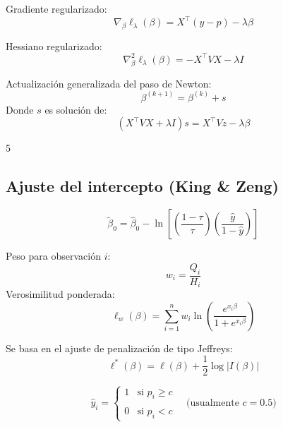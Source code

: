 \documentclass[12pt]{article}
\begin{document}
Gradiente regularizado:
\[
\nabla_\beta \ell_\lambda(\beta) = X^\top (y - p) - \lambda \beta
\]

Hessiano regularizado:
\[
\nabla^2_\beta \ell_\lambda(\beta) = - X^\top V X - \lambda I
\]

Actualización generalizada del paso de Newton:
\[
\beta^{(k+1)} = \beta^{(k)} + s
\]
Donde $s$ es solución de:
\[
(X^\top V X + \lambda I) s = X^\top V z - \lambda \beta
\]

5\subsection*{Ajuste del intercepto (King \& Zeng)}
\[
\tilde{\beta}_0 = \hat{\beta}_0 - \ln \left[ \left( \frac{1 - \tau}{\tau} \right) \left( \frac{\hat{y}}{1 - \hat{y}} \right) \right]
\]

Peso para observación $i$:
\[
w_i = \frac{Q_i}{H_i}
\]
Verosimilitud ponderada:
\[
\ell_w(\beta) = \sum_{i=1}^n w_i \ln \left( \frac{e^{x_i \beta}}{1 + e^{x_i \beta}} \right)
\]

Se basa en el ajuste de penalización de tipo Jeffreys:
\[
\ell^*(\beta) = \ell(\beta) + \frac{1}{2} \log |I(\beta)|
\]

\[
\hat{y}_i =
\begin{cases}
1 & \text{si } p_i \geq c \\\\
0 & \text{si } p_i < c
\end{cases}
\quad \text{(usualmente } c = 0.5)
\]


\newpage
\end{document}
